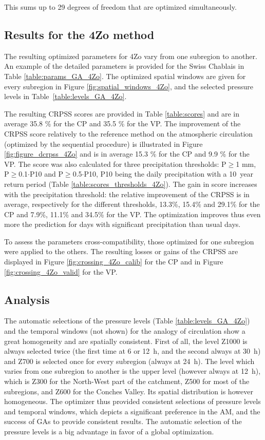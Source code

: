 \documentclass[review]{elsarticle}
\begin{document}
This sums up to 29 degrees of freedom that are optimized simultaneously.


\subsection{Results for the 4Zo method}

The resulting optimized parameters for 4Zo vary from one subregion to another. An example of the detailed parameters is provided for the Swiss Chablais in Table \ref{table:params_GA_4Zo}. The optimized spatial windows are given for every subregion in Figure \ref{fig:spatial_windows_4Zo}, and the selected pressure levels in Table~\ref{table:levels_GA_4Zo}. 

The resulting CRPSS scores are provided in Table \ref{table:scores} and are in average 35.8 \% for the CP and 35.5 \% for the VP. The improvement of the CRPSS score relatively to the reference method on the atmospheric circulation (optimized by the sequential procedure) is illustrated in Figure \ref{fig:figure_dcrpss_4Zo} and is in average 15.3 \% for the CP and 9.9 \% for the VP. The score was also calculated for three precipitation thresholds: P\(\geq\)1 mm, P\(\geq\)0.1\(\cdot\)P10 and P\(\geq\)0.5\(\cdot\)P10, P10 being the daily precipitation with a 10~year return period (Table \ref{table:scores_thresholds_4Zo}). The gain in score increases with the precipitation threshold: the relative improvement of the CRPSS is in average, respectively for the different thresholds, 13.3\%, 15.4\% and 29.1\% for the CP and 7.9\%, 11.1\% and 34.5\% for the VP. The optimization improves thus even more the prediction for days with significant precipitation than usual days.

To assess the parameters cross-compatibility, those optimized for one subregion were applied to the others. The resulting losses or gains of the CRPSS are displayed in Figure \ref{fig:crossing_4Zo_calib} for the CP and in Figure \ref{fig:crossing_4Zo_valid} for the VP.


\subsection{Analysis}

The automatic selections of the pressure levels (Table \ref{table:levels_GA_4Zo}) and the temporal windows (not shown) for the analogy of circulation show a great homogeneity and are spatially consistent. First of all, the level Z1000 is always selected twice (the first time at 6 or 12~h, and the second always at 30~h) and Z700 is selected once for every subregion (always at 24~h). The level which varies from one subregion to another is the upper level (however always at 12~h), which is Z300 for the North-West part of the catchment, Z500 for most of the subregions, and Z600 for the Conches Valley. Its spatial distribution is however homogeneous. The optimizer thus provided consistent selections of pressure levels and temporal windows, which depicts a significant preference in the AM, and the success of GAs to provide consistent results. The automatic selection of the pressure levels is a big advantage in favor of a global optimization.
\end{document}
